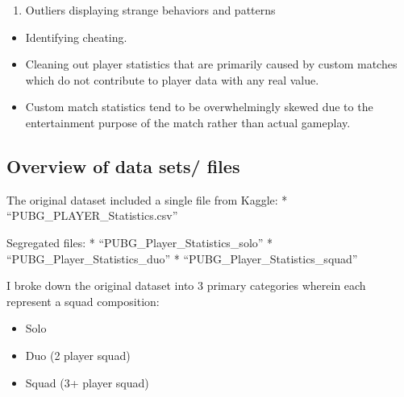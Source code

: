 \documentclass[]{article}
\providecommand{\tightlist}{%
  \setlength{\itemsep}{0pt}\setlength{\parskip}{0pt}}
\begin{document}
\begin{enumerate}
\def\labelenumi{\arabic{enumi}.}
\setcounter{enumi}{1}
\tightlist
\item
  Outliers displaying strange behaviors and patterns
\end{enumerate}

\begin{itemize}
\tightlist
\item
  Identifying cheating.
\item
  Cleaning out player statistics that are primarily caused by custom
  matches which do not contribute to player data with any real value.
\item
  Custom match statistics tend to be overwhelmingly skewed due to the
  entertainment purpose of the match rather than actual gameplay.
\end{itemize}

\subsection{Overview of data sets/
files}\label{overview-of-data-sets-files}

The original dataset included a single file from Kaggle: *
``PUBG\_PLAYER\_Statistics.csv''

Segregated files: * ``PUBG\_Player\_Statistics\_solo'' *
``PUBG\_Player\_Statistics\_duo'' * ``PUBG\_Player\_Statistics\_squad''

I broke down the original dataset into 3 primary categories wherein each
represent a squad composition:

\begin{itemize}
\tightlist
\item
  Solo
\item
  Duo (2 player squad)
\item
  Squad (3+ player squad)
\end{itemize}
\end{document}
